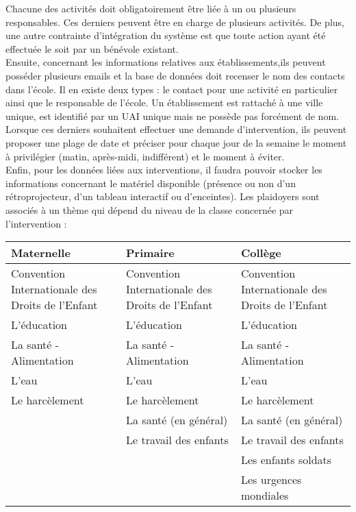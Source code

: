 Chacune des activités doit obligatoirement être liée à un ou plusieurs responsables. Ces derniers peuvent être en charge de plusieurs activités. De plus, une autre contrainte d'intégration du système est que toute action ayant été effectuée le soit par un bénévole existant. \\

Ensuite, concernant les informations relatives aux établissements,ils peuvent posséder plusieurs emails et la base de données doit recenser le nom des contacts dans l'école. Il en existe deux types : le contact pour une activité en particulier ainsi que le responsable de l'école. Un établissement est rattaché à une ville unique, est identifié par un UAI unique mais ne possède pas forcément de nom. Lorsque ces derniers souhaitent effectuer une demande d'intervention, ils peuvent proposer une plage de date et préciser pour chaque jour de la semaine le moment à privilégier (matin, après-midi, indifférent) et le moment à éviter. \\

Enfin, pour les données liées aux interventions, il faudra pouvoir stocker les informations concernant le matériel disponible (présence ou non d'un rétroprojecteur, d'un tableau interactif ou d'enceintes). Les plaidoyers sont associés à un thème qui dépend du niveau de la classe concernée par l'intervention :

\begin{tabular}{|p{5cm}|p{5cm}|p{5cm}|}
  \hline
  Maternelle & Primaire & Collège \\
  \hline
  Convention Internationale des Droits de l'Enfant & Convention Internationale des Droits de l'Enfant & Convention Internationale des Droits de l'Enfant \\
  \hline
  L'éducation & L'éducation & L'éducation \\
  \hline
  La santé - Alimentation & La santé - Alimentation & La santé - Alimentation \\
  \hline
  L'eau & L'eau & L'eau \\
  \hline
  Le harcèlement & Le harcèlement & Le harcèlement \\
  \hline
  & La santé (en général) & La santé (en général) \\
  \hline
  & Le travail des enfants & Le travail des enfants \\
  \hline
  & & Les enfants soldats \\
  \hline
  & & Les urgences mondiales \\
  \hline
\end{tabular}
